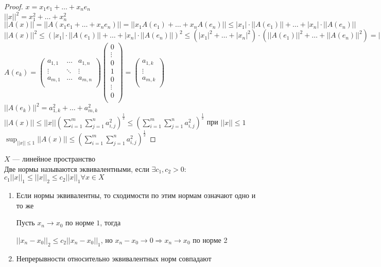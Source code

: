 \begin{proof}
$x = x_1e_1 + \dots + x_n e_n$ \\
$||x||^2 = x_1^2 + \dots + x_n^2$ \\
$||A(x)|| = ||A(x_1e_1 + \dots + x_n e_n)|| = ||x_1A(e_1) + \dots + x_nA(e_n)|| \le |x_1| \cdot ||A(e_1)|| + \dots + |x_n| \cdot ||A(e_n)||$ \\
$||A(x)||^2 \le (|x_1| \cdot ||A(e_1)|| + \dots + |x_n| \cdot ||A(e_n)||) ^ 2 \le (|x_1| ^ 2 + \dots + |x_n|^2) \cdot (||A(e_1)||^2 + \dots + ||A(e_n)||^2) = ||x^2|| (||A(e_1)||^2 + \dots + ||A(e_n)||^2) = ||x||^2 \cdot \sum_{i = 1}^m \sum_{j = 1}^n a_{i, j}^2$\\
$A(e_k) = 
\begin{pmatrix}
a_{1, 1} & \dots & a_{1, n}\\
\vdots & \ddots & \vdots\\
a_{m, 1} & \dots & a_{m, n}\\
\end{pmatrix}
\begin{pmatrix}
0\\
\vdots\\
0\\
1\\
0\\
\vdots\\
0\\
\end{pmatrix} = 
\begin{pmatrix}
a_{1, k}\\
\vdots\\
a_{m, k}\\
\end{pmatrix}$\\
$||A(e_k)||^2 = a_{1, k}^2 + \dots + a_{m, k}^2$\\
$||A(x)|| \le ||x||(\sum_{i = 1}^m \sum_{j = 1}^n a_{i, j}^2)^{\frac{1}{2}} \le (\sum_{i = 1}^m \sum_{j = 1}^n a_{i, j}^2)^{\frac{1}{2}}$ при $||x|| \le 1$\\
$\sup_{||x|| \le 1}||A(x)|| \le (\sum_{i = 1}^m \sum_{j = 1}^n a_{i, j}^2)^{\frac{1}{2}}$
\end{proof}
\begin{Def}
$X$ --- линейное пространство\\
Две нормы называются эквивалентными, если $\exists c_1, c_2 > 0 \colon$\\
$c_1||x||_1 \le ||x||_2 \le c_2||x||_1 \forall x \in X$\\
\end{Def}
\begin{Rem}


\begin{enumerate}
\item Если нормы эквивалентны, то сходимости по этим нормам означают одно и то же

Пусть $x_n \rightarrow x_0$ по норме  $1$, тогда

$||x_n - x_0||_2 \le c_2||x_n - x_0||_1$, но $x_n - x_0 \rightarrow 0 \Rightarrow x_n \rightarrow x_0$ по норме 2

\item Непрерывности относительно эквивалентных норм совпадают
\end{enumerate}
\end{Rem}

